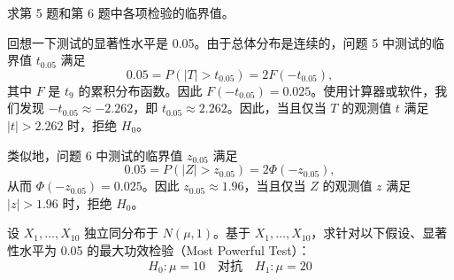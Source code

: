 \begin{questions}
\question 求第 5 题和第 6 题中各项检验的临界值。

\begin{solution}
回想一下测试的显著性水平是 0.05。由于总体分布是连续的，问题 5 中测试的临界值 $t_{0.05}$ 满足
\[
0.05 = P(|T| > t_{0.05}) = 2F(-t_{0.05}),
\]
其中 $F$ 是 $t_9$ 的累积分布函数。因此 $F(-t_{0.05}) = 0.025$。使用计算器或软件，我们发现 $-t_{0.05} \approx -2.262$，即 $t_{0.05} \approx 2.262$。因此，当且仅当 $T$ 的观测值 $t$ 满足 $|t| > 2.262$ 时，拒绝 $H_0$。

类似地，问题 6 中测试的临界值 $z_{0.05}$ 满足
\[
0.05 = P(|Z| > z_{0.05}) = 2\Phi(-z_{0.05}),
\]
从而 $\Phi(-z_{0.05}) = 0.025$。因此 $z_{0.05} \approx 1.96$，当且仅当 $Z$ 的观测值 $z$ 满足 $|z| > 1.96$ 时，拒绝 $H_0$。
\end{solution}

\question 设 $X_1, \dots, X_{10}$ 独立同分布于 $N(\mu, 1)$。基于 $X_1, \dots, X_{10}$，求针对以下假设、显著性水平为 0.05 的最大功效检验（Most Powerful Test）：
\[
H_0 : \mu = 10 \quad \text{对抗} \quad H_1 : \mu = 20
\]


\end{questions}
